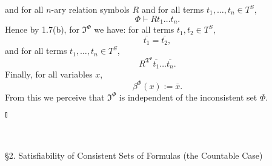 \begin{enumerate}[1.]
\[\]
and for all $n$-ary relation symbols $R$ and for all terms $t_1, \ldots, t_n \in T^S$,
\[
\Phi \vdash Rt_1 \ldots t_n.
\]
Hence by 1.7(b), for $\mathfrak{I}^{\Phi}$ we have: for all terms $t_1, t_2 \in T^S$,
\[
\overline{t_1} = \overline{t_2},
\]
and for all terms $t_1, \ldots, t_n \in T^S$,
\[
R^{\mathfrak{T}^{\Phi}} \overline{t_1} \ldots \overline{t_n}.
\]
Finally, for all variables $x$,
\[
\beta^{\Phi}(x) := \overline{x}.
\]
From this we perceive that $\mathfrak{I}^{\Phi}$ is independent of the inconsistent set $\Phi$. \begin{flushright}$\talloblong$\end{flushright}
\end{enumerate}
\ 
\\
\\
{\large \S2. Satisfiability of Consistent Sets of Formulas (the Countable Case)}
